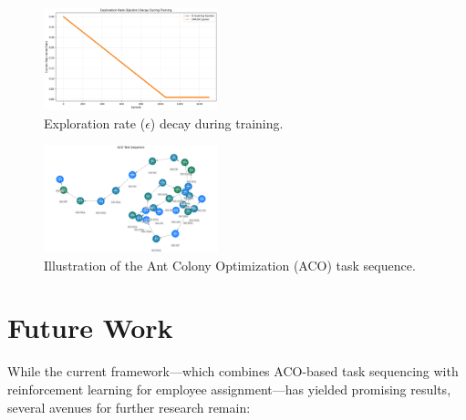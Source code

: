 \documentclass[conference]{IEEEtran}
\begin{document}
\begin{figure}[htbp]
	\centering
	\includegraphics[width=0.45\textwidth]{figures/Epsilon_Decay.png}
	\caption{Exploration rate ($\epsilon$) decay during training.}
	\label{fig:epsilon_decay}
\end{figure}

\begin{figure}[htbp]
	\centering
	\includegraphics[width=0.45\textwidth]{figures/ACO_Task_Sequence.png}
	\caption{Illustration of the Ant Colony Optimization (ACO) task sequence.}
	\label{fig:aco_sequence}
\end{figure}


	\section{Future Work}

	While the current framework—which combines ACO-based task sequencing with
	reinforcement learning for employee assignment—has yielded promising results, several
	avenues for further research remain:
\end{document}

